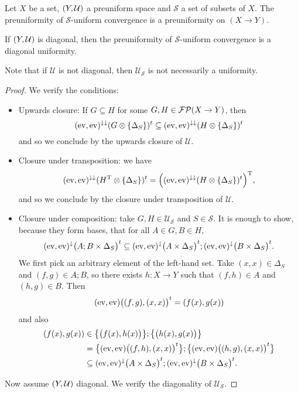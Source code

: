 \begin{lemma}
Let $X$ be a set, $\left( Y, \mathcal{U} \right)$ a preuniform space and $\mathcal{S}$ a set of subsets of $X$. The preuniformity of $\mathcal{S}$-uniform convergence is a preuniformity on $(X\to Y)$.

If $\left( Y, \mathcal{U} \right)$ is diagonal, then the preuniformity of $\mathcal{S}$-uniform convergence is a diagonal uniformity.
\end{lemma}
Note that if $\mathcal{U}$ is not diagonal, then $\mathcal{U}_\mathcal{S}$ is not necessarily a uniformity.
\begin{proof}
We verify the conditions:
\begin{itemize}
\item Upwards closure: If $G\subseteq H$ for some $G,H\in\operatorname{\mathcal{FP}}(X\to Y)$, then
\[ (\operatorname{ev}, \operatorname{ev})^{\downarrow\downarrow}(G\otimes \{\Delta_S\})^t \subseteq (\operatorname{ev}, \operatorname{ev})^{\downarrow\downarrow}(H\otimes \{\Delta_S\})^t \]
and so we conclude by the upwards closure of $\mathcal{U}$.
\item Closure under transposition: we have
\[ (\operatorname{ev}, \operatorname{ev})^{\downarrow\downarrow}(H^{\mathrm{T}}\otimes \{\Delta_S\})^t = \Big((\operatorname{ev}, \operatorname{ev})^{\downarrow\downarrow}(H\otimes \{\Delta_S\})^t\Big)^{\mathrm{T}}, \]
and so we conclude by the closure under transposition of $\mathcal{U}$.
\item Closure under composition: take $G,H\in\mathcal{U}_\mathcal{S}$ and $S\in\mathcal{S}$. It is enough to show, because they form bases, that for all $A\in G, B\in H$,
\[ (\operatorname{ev}, \operatorname{ev})^\downarrow\big(A;B \times \Delta_S\big)^t \subseteq (\operatorname{ev}, \operatorname{ev})^\downarrow\big(A \times \Delta_S\big)^t ; (\operatorname{ev}, \operatorname{ev})^\downarrow\big(B \times \Delta_S\big)^t. \]
We first pick an arbitrary element of the left-hand set. Take $(x,x)\in\Delta_S$ and $(f, g)\in A;B$, so there exists $h:X\to Y$ such that $(f,h)\in A$ and $(h,g)\in B$. Then
\[ (\operatorname{ev}, \operatorname{ev})\big((f,g), (x,x)\big)^t = (f(x), g(x)) \]
and also
\begin{align*}
(f(x), g(x)) &\in \big\{\big(f(x), h(x)\big)\big\};\big\{\big(h(x), g(x)\big)\big\} \\
&= \big\{(\operatorname{ev}, \operatorname{ev})\big((f,h), (x,x)\big)^t\big\};\big\{(\operatorname{ev}, \operatorname{ev})\big((h,g), (x,x)\big)^t\big\} \\
&\subseteq (\operatorname{ev}, \operatorname{ev})^\downarrow\big(A \times \Delta_S\big)^t ; (\operatorname{ev}, \operatorname{ev})^\downarrow\big(B \times \Delta_S\big)^t.
\end{align*}
\end{itemize}
Now assume $\left( Y, \mathcal{U} \right)$ diagonal. We verify the diagonality of $\mathcal{U}_\mathcal{S}$.


\end{proof}
